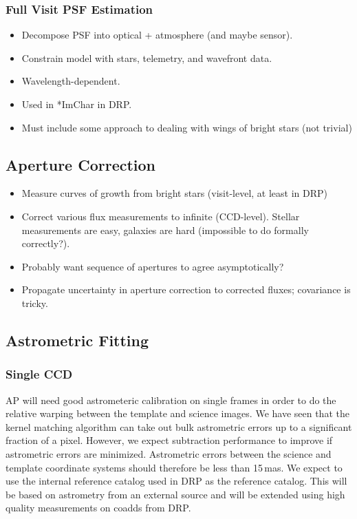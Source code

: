 \subsubsection{Full Visit PSF Estimation}
\label{sec:acFullVisitPSF}
\begin{itemize}
\item Decompose PSF into optical + atmosphere (and maybe sensor).
\item Constrain model with stars, telemetry, and wavefront data.
\item Wavelength-dependent.
\item Used in *ImChar in DRP.
\item Must include some approach to dealing with wings of bright stars (not trivial)
\end{itemize}

\subsection{Aperture Correction}
\label{sec:acApCorr}
\begin{itemize}
\item Measure curves of growth from bright stars (visit-level, at least in DRP)
\item Correct various flux measurements to infinite (CCD-level).  Stellar measurements are easy, galaxies are hard (impossible to do formally correctly?).
\item Probably want sequence of apertures to agree asymptotically?
\item Propagate uncertainty in aperture correction to corrected fluxes; covariance is tricky.
\end{itemize}

\subsection{Astrometric Fitting}
\label{sec:acAstrometricFitting}
\subsubsection{Single CCD}
\label{sec:acSingleCCDAstrometricFit}

AP will need good astrometeric calibration on single frames in order to do the relative warping between the template and science images.  We have seen that the kernel matching algorithm can take out bulk astrometric errors up to a significant fraction of a pixel.  However, we expect subtraction performance to improve if astrometric errors are minimized.  Astrometric errors between the science and template coordinate systems should therefore be less than 15\,mas.  We expect to use the internal reference catalog used in DRP as the reference catalog.  This will be based on astrometry from an external source and will be extended using high quality measurements on coadds from DRP.


